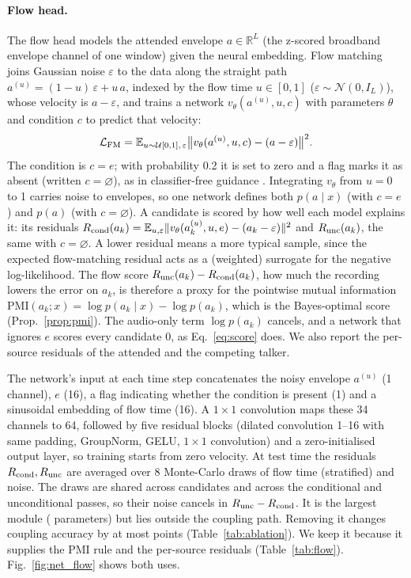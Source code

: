 \documentclass[twoside]{article}
\newcommand{\PMI}{\mathrm{PMI}}
\begin{document}
\paragraph{Flow head.} The flow head models the attended envelope $a\in\mathbb R^{L}$ (the
z-scored broadband envelope channel of one window) given the neural embedding.
Flow matching joins Gaussian noise $\varepsilon$ to the data
along the straight path $a^{(u)}=(1-u)\,\varepsilon+u\,a$, indexed by the flow time
$u\in[0,1]$ ($\varepsilon\sim\mathcal N(0,I_L)$), whose velocity is $a-\varepsilon$, and trains a
network $v_\theta(a^{(u)},u,c)$ with parameters $\theta$ and condition $c$ to predict that
velocity:
\begin{equation}
\mathcal L_{\rm FM}=\mathbb E_{u\sim\mathcal U[0,1],\,\varepsilon}\big\|v_\theta(a^{(u)},u,c)-(a-\varepsilon)\big\|^2 .
\label{eq:fm}
\end{equation}
The condition is $c=e$; with probability 0.2 it is set to zero and a flag marks it as
absent (written $c=\varnothing$), as in classifier-free guidance \citep{ho2022classifierfree}. Integrating $v_\theta$ from $u=0$ to 1 carries noise to
envelopes, so one network defines both $p(a\mid x)$ (with $c=e$) and $p(a)$ (with
$c=\varnothing$).
A candidate is scored by how well each model explains it: its residuals
$R_{\rm cond}(a_k)=\mathbb E_{u,\varepsilon}\|v_\theta(a_k^{(u)},u,e)-(a_k-\varepsilon)\|^2$ and
$R_{\rm unc}(a_k)$, the same with $c=\varnothing$. A lower residual means a more typical sample,
since the expected flow-matching residual acts as a (weighted) surrogate for the negative
log-likelihood. The flow score $R_{\rm unc}(a_k)-R_{\rm cond}(a_k)$, how much the recording lowers the error
on $a_k$, is therefore a proxy for the pointwise mutual information
$\PMI(a_k;x)=\log p(a_k\mid x)-\log p(a_k)$, which is the Bayes-optimal score (Prop.~\ref{prop:pmi}). The audio-only term $\log p(a_k)$ cancels, and
a network that ignores $e$ scores every candidate 0, as Eq.~\ref{eq:score} does.
We also report the per-source residuals of the attended and the competing talker.

The network's input at each time step concatenates the noisy envelope $a^{(u)}$ (1 channel),
$e$ (16), a flag indicating whether the condition is present (1) and a sinusoidal
embedding of flow time (16). A $1{\times}1$ convolution maps these 34 channels to 64,
followed by five residual blocks (dilated convolution 1--16 with same padding, GroupNorm,
GELU, $1{\times}1$ convolution) and a zero-initialised output layer, so training starts
from zero velocity. At test time the residuals $R_{\rm cond},R_{\rm unc}$ are averaged over 8
Monte-Carlo draws of flow time (stratified) and noise. The draws are shared across
candidates and across the conditional and unconditional passes, so their noise cancels in
$R_{\rm unc}-R_{\rm cond}$. It is the largest module (\archFlow{} parameters) but lies outside the coupling
path. Removing it changes coupling accuracy by at most \ablOtherMax{} points
(Table~\ref{tab:ablation}). We keep it because it supplies the PMI rule and the
per-source residuals (Table~\ref{tab:flow}). Fig.~\ref{fig:net_flow} shows both uses.
\end{document}
